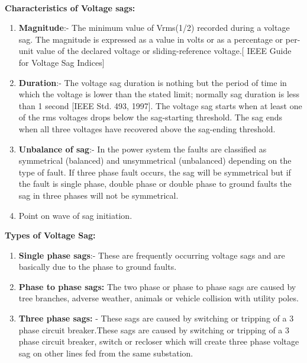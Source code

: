 \documentclass[17pt, a4paper]{extreport}
\begin{document}
\paragraph{}
\textbf{Characteristics of Voltage sags:}
\begin{enumerate}
    \item 	\textbf{Magnitude}:- The minimum value of Vrms(1/2) recorded during a voltage sag. The magnitude is expressed as a value in volts or as a percentage or per-unit value of the declared voltage or sliding-reference voltage.[ IEEE Guide for Voltage Sag Indices]
    
    \item 	\textbf{Duration}:- The voltage sag duration is nothing but the period of time in which the voltage is lower than the stated limit; normally sag duration is less than 1 second [IEEE Std. 493, 1997]. The voltage sag starts when at least one of the rms voltages drops below the sag-starting threshold. The sag ends when all three voltages have recovered above the sag-ending threshold.
    
    \item \textbf{Unbalance of sag}:- In the power system the faults are classified as symmetrical (balanced) and unsymmetrical (unbalanced) depending on the type of fault. If three phase fault occurs, the sag will be symmetrical but if the fault is single phase, double phase or double phase to ground faults the sag in three phases will not be symmetrical.
    
    \item 	Point on wave of sag initiation.
    
\end{enumerate}

\textbf{Types of Voltage Sag:}
\begin{enumerate}
    \item \textbf{Single phase sags}:- These are frequently occurring voltage sags and are basically due to the phase to ground faults.
    
    \item \textbf{Phase to phase sags:} The two phase or phase to phase sags are caused by tree branches, adverse weather, animals or vehicle collision with utility poles.
    \item \textbf{Three phase sags:} - These sags are caused by switching or tripping of a 3 phase circuit breaker.These sags are caused by switching or tripping of a 3 phase circuit breaker, switch or recloser which will create three phase voltage sag on other lines fed from the same substation.
    
    
\end{enumerate}
\end{document}
